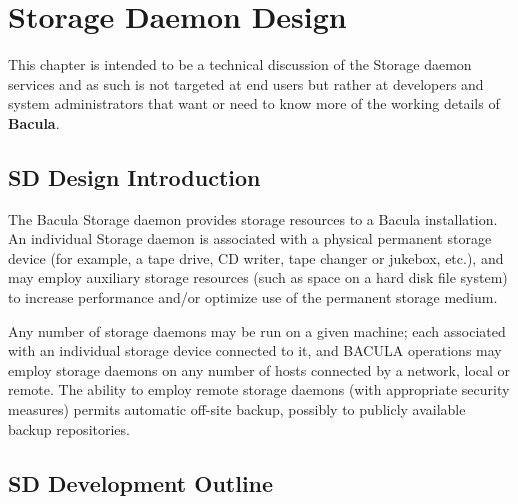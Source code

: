 
\section*{Storage Daemon Design}
\label{_ChapterStart3}

This chapter is intended to be a technical discussion of the Storage daemon
services and as such is not targeted at end users but rather at developers and
system administrators that want or need to know more of the working details of
{\bf Bacula}. 

\subsection*{SD Design Introduction}

The Bacula Storage daemon provides storage resources to a Bacula installation.
An individual Storage daemon is associated with a physical permanent storage
device (for example, a tape drive, CD writer, tape changer or jukebox, etc.),
and may employ auxiliary storage resources (such as space on a hard disk file
system) to increase performance and/or optimize use of the permanent storage
medium. 

Any number of storage daemons may be run on a given machine; each associated
with an individual storage device connected to it, and BACULA operations may
employ storage daemons on any number of hosts connected by a network, local or
remote. The ability to employ remote storage daemons (with appropriate
security measures) permits automatic off-site backup, possibly to publicly
available backup repositories. 

\subsection*{SD Development Outline}

